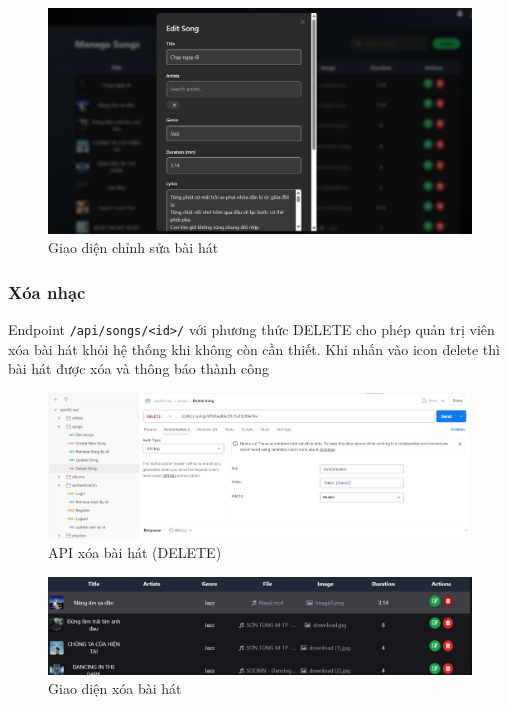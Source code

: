 \begin{figure}[H]
    \centering
    \includegraphics[width=1\textwidth]{latex/imgs/frontend-edit-song.jpg}
    \caption{Giao diện chỉnh sửa bài hát}
\end{figure}

\subsubsection{Xóa nhạc}
Endpoint \texttt{/api/songs/<id>/} với phương thức DELETE cho phép quản trị viên xóa bài hát khỏi hệ thống khi không còn cần thiết. Khi nhấn vào icon delete thì bài hát được xóa và thông báo thành công

\begin{figure}[H]
    \centering
    \includegraphics[width=1\textwidth]{latex/imgs/api-delete-song.jpg}
    \caption{API xóa bài hát (DELETE)}
\end{figure}

\begin{figure}[H]
    \centering
    \includegraphics[width=1\textwidth]{latex/imgs/frontend-delete-song.jpg}
    \caption{Giao diện xóa bài hát}
\end{figure}

